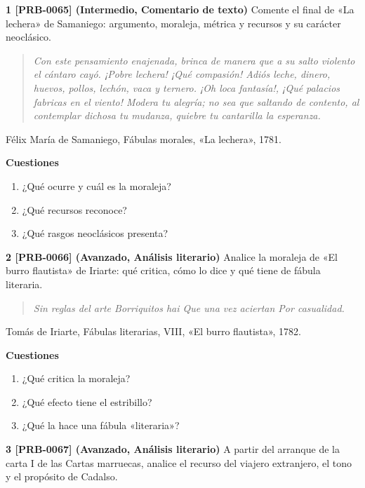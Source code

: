 \documentclass{book}
\begin{document}
\begin{tcolorbox}[title={Ejercicios}, studiumworked, breakable]

\noindent\textbf{1 [PRB-0065] (Intermedio, Comentario de texto)}
Comente el final de «La lechera» de Samaniego: argumento, moraleja, métrica y recursos y su carácter neoclásico.


\begin{quote}
\itshape Con este pensamiento enajenada, brinca de manera que a su salto violento el cántaro cayó. ¡Pobre lechera! ¡Qué compasión! Adiós leche, dinero, huevos, pollos, lechón, vaca y ternero. ¡Oh loca fantasía!, ¡Qué palacios fabricas en el viento! Modera tu alegría; no sea que saltando de contento, al contemplar dichosa tu mudanza, quiebre tu cantarilla la esperanza.
\end{quote}
{\noindent\footnotesize Félix María de Samaniego, Fábulas morales, «La lechera», 1781.\par}

\noindent\textbf{Cuestiones}
\begin{enumerate}
\item ¿Qué ocurre y cuál es la moraleja?
\item ¿Qué recursos reconoce?
\item ¿Qué rasgos neoclásicos presenta?
\end{enumerate}

\noindent\textbf{2 [PRB-0066] (Avanzado, Análisis literario)}
Analice la moraleja de «El burro flautista» de Iriarte: qué critica, cómo lo dice y qué tiene de fábula literaria.


\begin{quote}
\itshape Sin reglas del arte Borriquitos hai Que una vez aciertan Por casualidad.
\end{quote}
{\noindent\footnotesize Tomás de Iriarte, Fábulas literarias, VIII, «El burro flautista», 1782.\par}

\noindent\textbf{Cuestiones}
\begin{enumerate}
\item ¿Qué critica la moraleja?
\item ¿Qué efecto tiene el estribillo?
\item ¿Qué la hace una fábula «literaria»?
\end{enumerate}

\noindent\textbf{3 [PRB-0067] (Avanzado, Análisis literario)}
A partir del arranque de la carta I de las Cartas marruecas, analice el recurso del viajero extranjero, el tono y el propósito de Cadalso.



\end{tcolorbox}
\end{document}
